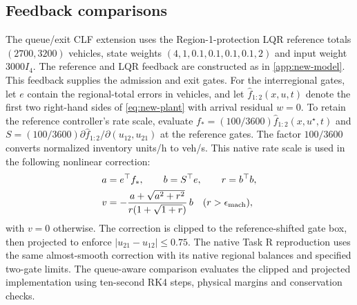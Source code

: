 \documentclass[preprint,12pt]{elsarticle}
\newcommand{\appref}[1]{\ref{#1}}
\begin{document}
\subsection{Feedback comparisons}
\label{app:benchmark-details}
The queue/exit CLF extension uses the Region-1-protection LQR reference
totals $(2700,3200)$ vehicles, state weights
$(4,1,0.1,0.1,0.1,0.1,2)$ and input weight $3000I_4$. The reference and LQR
feedback are constructed as in \appref{app:new-model}. This feedback
supplies the admission and exit gates. For the interregional gates, let
$e$ contain the regional-total errors in vehicles, and let
$\widehat f_{1:2}(x,u,t)$ denote the first two right-hand sides of
\eqref{eq:new-plant} with arrival residual $w=0$.
To retain the reference controller's rate scale, evaluate
$f_*=(100/3600)\widehat f_{1:2}(x,u^\star,t)$ and
$S=(100/3600)\partial\widehat f_{1:2}/\partial(u_{12},u_{21})$ at the reference
gates. The factor $100/3600$ converts normalized inventory units/h to
veh/s. This native rate scale is used in the following nonlinear correction:
\[
\begin{aligned}
a&=e^\top f_*,\qquad b=S^\top e,\qquad r=b^\top b,\\
v&=-\frac{a+\sqrt{a^2+r^2}}{r(1+\sqrt{1+r})}\,b
\quad(r>\epsilon_{\rm mach}),
\end{aligned}
\]
with $v=0$ otherwise. The correction is clipped to the reference-shifted
gate box, then projected to enforce $|u_{21}-u_{12}|\le0.75$. The native
Task R reproduction uses the same almost-smooth correction with its native
regional balances and specified two-gate limits. The queue-aware
comparison evaluates the clipped and projected implementation using
ten-second RK4 steps, physical margins and conservation checks.
\end{document}
